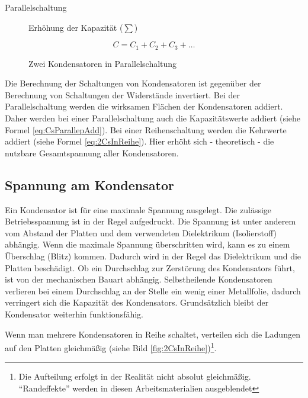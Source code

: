 \begin{frame}
  \begin{description}
    \item[Parallelschaltung] Erhöhung der Kapazität ($\sum$)
  \end{description}

  \begin{equation}
    C=C_1+C_2+C_3+ \dots
    \label{eq:CsParallepAdd}
  \end{equation}

  \begin{figure}[htb]
    \caption{Zwei Kondensatoren in Parallelschaltung}
    \label{fig:2CsParallel}
  \end{figure}
\end{frame}
Die Berechnung der Schaltungen von Kondensatoren ist gegenüber der Berechnung von Schaltungen der Widerstände invertiert. Bei der Parallelschaltung werden die wirksamen Flächen der Kondensatoren addiert. Daher werden bei einer Parallelschaltung auch die Kapazitätswerte addiert (siehe Formel \ref{eq:CsParallepAdd}). Bei einer Reihenschaltung werden die Kehrwerte addiert (siehe Formel \ref{eq:2CsInReihe}). Hier erhöht sich - theoretisch - die nutzbare Gesamtspannung aller Kondensatoren.

\subsection{Spannung am Kondensator}
Ein Kondensator ist für eine maximale Spannung ausgelegt. Die zulässige Betriebsspannung ist in der Regel aufgedruckt. Die Spannung ist unter anderem vom Abstand der Platten und dem verwendeten Dielektrikum (Isolierstoff) abhängig. Wenn die maximale Spannung überschritten wird, kann es zu einem Überschlag (Blitz) kommen. Dadurch wird in der Regel das Dielektrikum und die Platten beschädigt. Ob ein Durchschlag zur Zerstörung des Kondensators führt, ist von der mechanischen Bauart abhängig. Selbstheilende Kondensatoren verlieren bei einem Durchschlag an der Stelle ein wenig einer Metallfolie, dadurch verringert sich die Kapazität des Kondensators. Grundsätzlich bleibt der Kondensator weiterhin funktionsfähig.

Wenn man mehrere Kondensatoren in Reihe schaltet, verteilen sich die Ladungen auf den Platten gleichmäßig (siehe Bild \ref{fig:2CsInReihe})\footnote{Die Aufteilung erfolgt in der Realität nicht absolut gleichmäßig. "`Randeffekte"' werden in diesen Arbeitsmaterialien ausgeblendet}.

